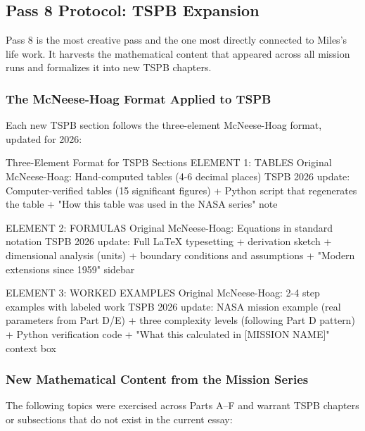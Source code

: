 \documentclass[11pt,letterpaper]{article}
\begin{document}
\subsection{Pass 8 Protocol: TSPB Expansion}

Pass 8 is the most creative pass and the one most directly connected to Miles's life work. It harvests the mathematical content that appeared across all mission runs and formalizes it into new TSPB chapters.

\subsubsection{The McNeese-Hoag Format Applied to TSPB}

Each new TSPB section follows the three-element McNeese-Hoag format, updated for 2026:

\begin{mhbox}{Three-Element Format for TSPB Sections}
ELEMENT 1: TABLES
  Original McNeese-Hoag: Hand-computed tables (4-6 decimal places)
  TSPB 2026 update: Computer-verified tables (15 significant figures)
                   + Python script that regenerates the table
                   + "How this table was used in the NASA series" note

ELEMENT 2: FORMULAS
  Original McNeese-Hoag: Equations in standard notation
  TSPB 2026 update: Full LaTeX typesetting + derivation sketch
                   + dimensional analysis (units)
                   + boundary conditions and assumptions
                   + "Modern extensions since 1959" sidebar

ELEMENT 3: WORKED EXAMPLES
  Original McNeese-Hoag: 2-4 step examples with labeled work
  TSPB 2026 update: NASA mission example (real parameters from Part D/E)
                   + three complexity levels (following Part D pattern)
                   + Python verification code
                   + "What this calculated in [MISSION NAME]" context box
\end{mhbox}

\subsubsection{New Mathematical Content from the Mission Series}

The following topics were exercised across Parts A--F and warrant TSPB chapters or subsections that do not exist in the current essay:
\end{document}
